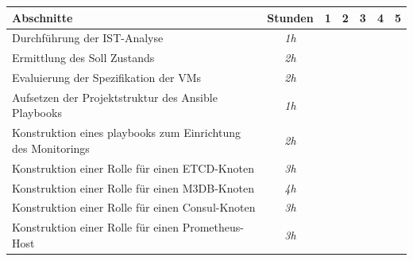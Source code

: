 \documentclass[11pt,a4paper]{article}
\begin{document}
\begin{table}[!htbp]
  \begin{tabular}{l c | c c c c c}
    Abschnitte    & Stunden
                  & 1         & 2                        & 3                        & 4                        & 5                                                   \\
    \hline
    Durchführung der IST-Analyse
                  & \emph{1h} & \cellcolor[HTML]{FFF587} &                          &                          &                          &                          \\
    Ermittlung des Soll Zustands
                  & \emph{2h} & \cellcolor[HTML]{FFF587} &                          &                          &                          &                          \\
    Evaluierung der Spezifikation der VMs
                  & \emph{2h} & \cellcolor[HTML]{FFF587} &                          &                          &                          &                          \\
    Aufsetzen der Projektstruktur des Ansible Playbooks
                  & \emph{1h} & \cellcolor[HTML]{FF8C64} &                          &                          &                          &                          \\
    Konstruktion eines \gls{playbooks} zum Einrichtung des Monitorings
                  & \emph{2h} & \cellcolor[HTML]{FF8C64} &                          &                          &                          &                          \\
    Konstruktion einer\glsadd{rollen} Rolle für einen ETCD-Knoten
                  & \emph{3h} &                          & \cellcolor[HTML]{FF8C64} &                          &                          &                          \\
    Konstruktion einer\glsadd{rollen} Rolle für einen M3DB-Knoten
                  & \emph{4h} &                          & \cellcolor[HTML]{FF8C64} &                          &                          &                          \\
    Konstruktion einer\glsadd{rollen} Rolle für einen Consul-Knoten
                  & \emph{3h} &                          &                          & \cellcolor[HTML]{FF8C64} &                          &                          \\
    Konstruktion einer\glsadd{rollen} Rolle für einen Prometheus-Host
                  & \emph{3h} &                          &                          & \cellcolor[HTML]{FF8C64} &                          &                          \\

\end{tabular}
\end{table}
\end{document}

